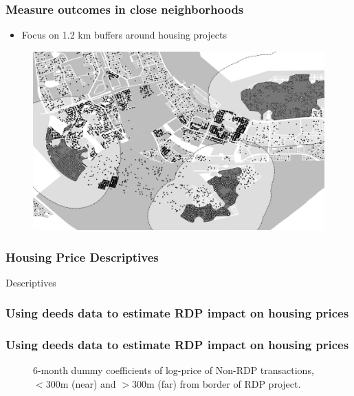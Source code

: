 \documentclass[aspectratio=149]{beamer}
\begin{document}

\begin{frame}
\frametitle{Measure outcomes in close neighborhoods}
\begin{itemize}
  \item Focus on 1.2 km buffers around housing projects
\end{itemize}
\begin{center}
\begin{figure}
\includegraphics[scale=0.30]{design2.png}
\vspace{-3mm}
\end{figure}
\end{center}
\end{frame}


\begin{frame}
\frametitle{Housing Price Descriptives}
\begin{table}
\caption{Descriptives}

\end{table}
\end{frame}


\begin{frame}
\frametitle{Using deeds data to estimate RDP impact on housing prices}



\end{frame}





\begin{frame}
\frametitle{Using deeds data to estimate RDP impact on housing prices}

\begin{center}
\begin{figure}
\vspace{-3mm}
\caption{6-month dummy coefficients of log-price of Non-RDP transactions, $<$300m (near) and $>$300m (far) from border of RDP project.}
\end{figure}
\end{center}


\end{frame}
\end{document}
